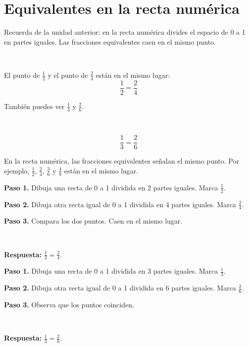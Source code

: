 \section{Equivalentes en la recta numérica}

Recuerda de la unidad anterior: en la recta numérica divides el espacio de 0 a 1 en partes iguales. Las fracciones equivalentes caen en el mismo punto.

\begin{center}
\\[2pt]
\end{center}

El punto de $\frac{1}{2}$ y el punto de $\frac{2}{4}$ están en el mismo lugar:
\[
\frac{1}{2}=\frac{2}{4}
\]

También puedes ver $\frac{1}{3}$ y $\frac{2}{6}$.

\begin{center}
\\[2pt]
\end{center}

\[
\frac{1}{3}=\frac{2}{6}
\]

\begin{wbidea}
En la recta numérica, las fracciones equivalentes señalan el mismo punto. Por ejemplo, $\frac{1}{2}$, $\frac{2}{4}$, $\frac{3}{6}$ y $\frac{4}{8}$ están en el mismo lugar.
\end{wbidea}

\begin{wbexample}
\textbf{Paso 1.} Dibuja una recta de 0 a 1 dividida en 2 partes iguales. Marca $\frac{1}{2}$.

\textbf{Paso 2.} Dibuja otra recta igual de 0 a 1 dividida en 4 partes iguales. Marca $\frac{2}{4}$.

\textbf{Paso 3.} Compara los dos puntos. Caen en el mismo lugar.

\begin{center}
\\[2pt]
\end{center}

\textbf{Respuesta:} $\frac{1}{2}=\frac{2}{4}$.
\end{wbexample}

\begin{wbexample}
\textbf{Paso 1.} Dibuja una recta de 0 a 1 dividida en 3 partes iguales. Marca $\frac{1}{3}$.

\textbf{Paso 2.} Dibuja otra recta igual de 0 a 1 dividida en 6 partes iguales. Marca $\frac{2}{6}$.

\textbf{Paso 3.} Observa que los puntos coinciden.

\begin{center}
\\[2pt]
\end{center}

\textbf{Respuesta:} $\frac{1}{3}=\frac{2}{6}$.
\end{wbexample}

